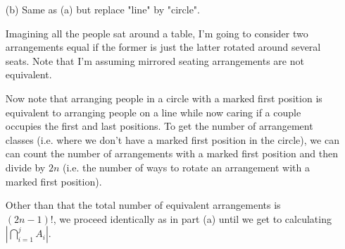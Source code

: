\documentclass{book}
\newcommand{\exOne}{%
   \color{Purple}%
   \fontsize{13}{15}\selectfont%
}
\newenvironment{myIndent}{%
   \begin{adjustwidth}{2.5em}{0em}%
}{%
   \end{adjustwidth}%
}
\newcommand{\retTwo}{\hfill\bigbreak}
\begin{document}
\begin{enumerate}
\begin{myIndent}
\begin{myIndent}
\begin{itemize}
				{\centering $\binom{2n - 2j + j + 1 - 1}{2n - 2j} = \binom{2n - j}{2n - 2j} = \frac{(2n-j)!}{(2n-2j)!j!}$ choices.\par}

				\item We can order the blocks in $j!$ many ways.
				\item There are $(2n-2j)$ many people left over who can get placed in any remaining spot. This gives $(2n-2j)!$ choices.
			\end{itemize}

			Thus we get that: $|\bigcap\limits_{i=1}^j A_i| = 2^j j!(2n-2j)!\frac{(2n-j)!}{(2n-2j)!j!} = 2^j(2n-j)!$
		\end{myIndent}

		So our final total is:

		{\centering
		\begin{tabular}{l}
			$(2n)! + \sum\limits_{j=1}^n(-1)^j \binom{n}{j} 2^j(2n - j)!$
		\end{tabular}\retTwo\par}
	\end{myIndent}

	\item[(b)] Same as (a) but replace "line" by "circle".
	
	\begin{myIndent}\exOne
		Imagining all the people sat around a table, I'm going to consider two arrangements equal if the former is just the latter rotated around several seats. Note that I'm assuming mirrored seating arrangements are not equivalent.\newpage

		Now note that arranging people in a circle with a marked first position is\\ equivalent to arranging people on a line while now caring if a couple\\ occupies the first and last positions. To get the number of arrangement classes (i.e. where we don't have a marked first position in the circle), we can can count the number of arrangements with a marked first position and then divide by $2n$ (i.e. the number of ways to rotate an arrangement with a marked first position).\retTwo

		Other than that the total number of equivalent arrangements is\\ [-4pt] $(2n - 1)!$, we proceed identically as in part (a) until we get to  calculating $|\bigcap\limits_{i=1}^j A_i|$.\retTwo


\end{myIndent}
\end{enumerate}
\end{document}

